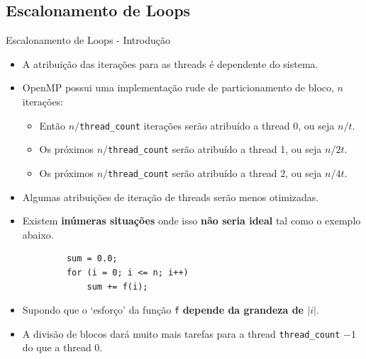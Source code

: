 	\subsection{Escalonamento de Loops}
	\begin{frame}[fragile]{Escalonamento de Loops - Introdução}
		\begin{itemize}
			\setlength\itemsep{0.3em}
			\item A atribuição das iterações para as threads é dependente do sistema.
			\item OpenMP possui uma implementação rude de particionamento de bloco, \pause $n$ iterações:
			\begin{itemize}
				\item Então $n/${\tt thread\_count} iterações serão atribuído a thread 0, ou seja $n/t$.
				\item Os próximos $n/${\tt thread\_count} serão atribuído a thread 1, ou seja $n/2t$.
				\item Os próximos $n/${\tt thread\_count} serão atribuído a thread 2, ou seja $n/4t$.
			\end{itemize}
			\item Algumas atribuições de iteração de threads serão menos otimizadas.
					\pause
			\item Existem \textbf{inúmeras situações} onde isso \textbf{não seria ideal} tal como o exemplo abaixo.
		\end{itemize}
		\begin{verbatim}
			sum = 0.0;
			for (i = 0; i <= n; i++) 
				sum += f(i);
		\end{verbatim}
		\begin{itemize}
			\setlength\itemsep{0.2em}
			\item Supondo que o `esforço' da função {\tt f} \textbf{depende da grandeza de $|i|$}.
					\pause
			\item A divisão de blocos dará muito mais tarefas para a thread {\tt thread\_count} $-1$ do que a thread 0.
		\end{itemize}
\end{frame}

